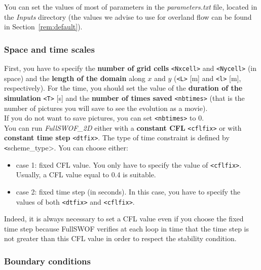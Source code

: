 \documentclass[a4paper, 11pt]{article}
\newcommand{\FullSWOF}{\emph{FullSWOF\_2D}}
\begin{document}
You can set the values of most of parameters in the \textit{parameters.txt} file, located in the \textit{Inputs} directory (the values we advise 
to use for overland flow can be found in Section~\ref{rem:default}).

\subsubsection{Space and time scales}

First, you have to specify the \textbf{number of grid cells} \texttt{<Nxcell>} and \texttt{<Nycell>} (in space) and the \textbf{length of  the domain} along $x$ and $y$ (\texttt{<L>} [m] and \texttt{<l>} [m], respectively).
For the time, you should set the value of the \textbf{duration of the simulation} \texttt{<T>} [s] and the \textbf{number of times saved} \texttt{<nbtimes>}
(that is the number of pictures you will save to see the evolution as a movie). \\
If you do not want to save pictures, you can set \texttt{<nbtimes>} to 0.\\

You can run \FullSWOF{} either with a \textbf{constant CFL} \texttt{<cflfix>} or with \textbf{constant time step} \texttt{<dtfix>}.
The type of time constraint is defined by \texttt<scheme\_type>. You can choose either:
\begin{itemize}
\item case 1: fixed CFL value. You only have to specify the value of \texttt{<cflfix>}. Usually, a CFL value equal to 0.4 is suitable.
\item case 2: fixed time step (in seconds). In this case, you have to specify the values of both \texttt{<dtfix>} and \texttt{<cflfix>}.
\end{itemize}
Indeed, it is always necessary to set a CFL value even if you choose the fixed time step because FullSWOF{} verifies at each loop in time that the time step is not greater than this CFL value in order to respect the stability condition.

\subsubsection{Boundary conditions}
\end{document}
